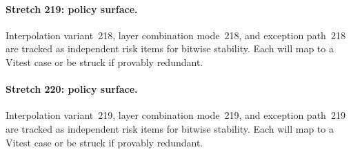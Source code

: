 \documentclass[sigconf,nonacm]{acmart}
\begin{document}
\paragraph{Stretch 219: policy surface.}
Interpolation variant~218, layer combination mode~218, and exception path~218 are tracked as independent risk items for bitwise stability. Each will map to a Vitest case or be struck if provably redundant. %

\paragraph{Stretch 220: policy surface.}
Interpolation variant~219, layer combination mode~219, and exception path~219 are tracked as independent risk items for bitwise stability. Each will map to a Vitest case or be struck if provably redundant. %




\end{document}

